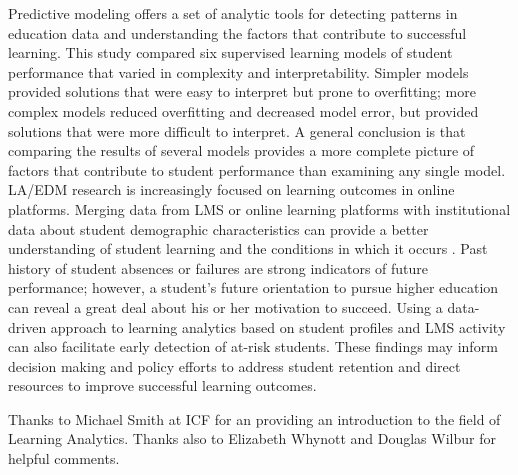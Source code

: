 \documentclass[sigconf]{acmart}
\begin{document}
Predictive modeling offers a set of analytic tools for detecting patterns in 
education data and understanding the factors that contribute to successful
learning. This study compared six supervised learning models of student 
performance that varied in complexity and interpretability. Simpler models 
provided solutions that were easy to interpret but prone to overfitting;
more complex models reduced overfitting and decreased model error, but 
provided solutions that were more difficult to interpret. A general conclusion 
is that comparing the results of several models provides a more complete 
picture of factors that contribute to student performance than examining any 
single model. LA/EDM research is increasingly focused on learning outcomes in 
online platforms. Merging data from LMS or online learning platforms with 
institutional data about student demographic characteristics can provide a 
better understanding of student learning and the conditions in which it 
occurs \cite{hora19, siemens12}. Past history of student absences or failures 
are strong indicators of future performance; however, a student's future 
orientation to pursue higher education can reveal a great deal about his 
or her motivation to succeed. Using a data-driven approach to learning 
analytics based on student profiles and LMS activity can also facilitate early 
detection of at-risk students. These findings may inform decision making and 
policy efforts to address student retention and direct resources to improve 
successful learning outcomes.


\begin{acks}

Thanks to Michael Smith at ICF for an providing an introduction to the field
of Learning Analytics. Thanks also to Elizabeth Whynott and Douglas Wilbur 
for helpful comments. 

\end{acks}


 
\end{document}
